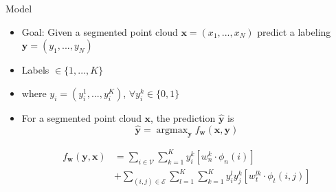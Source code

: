 \documentclass{beamer}
\DeclareMathOperator*{\argmax}{argmax}
\newcommand{\x}{{\mathbf x}}     %
\newcommand{\xs}[1]{{x_{#1}}}    %
\newcommand{\y}{{\mathbf y}}     %
\newcommand{\ys}[1]{{y_{#1}}}    %
\newcommand{\ysc}[2]{{y_{#1}^{#2}}}    %
\newcommand{\fn}[1]{{\phi_n(#1)}}      %
\newcommand{\fe}[3]{{\phi_{#1}(#2,#3)}}%
\newcommand{\w}{{\mathbf w}}           %
\newcommand{\wn}[1]{{w_n^{#1}}}        %
\newcommand{\we}[3]{{w_{#1}^{#2#3}}}   %
\newcommand{\df}[3]{{f_{#3}(#1,#2)}}   %
\begin{document}
\begin{frame}{Model}
\begin{itemize}


\item Goal: Given a segmented point cloud $\x=(\xs{1},...,\xs{N})$  predict a labeling $\y=(\ys{1},...,\ys{N})$
\item Labels $\in  \{ 1, ..., K \} $
\item where $\ys{i}=(\ysc{i}{1},...,\ysc{i}{K})$,  $ \forall \ysc{i}{k} \in \{0,1\}$ 


\item For a segmented point cloud $\x$, the prediction $\hat{\y}$ is 
\begin{equation} \label{eq:argmax}
\hat{\y} = \argmax_\y \df{\x}{\y}{\w}
\end{equation}

\pause
\begin{equation} \label{eq:model}
\begin{split}
\df{\y}{\x}{\w} & = \sum_{i \in \mathcal{V}} \sum_{k=1}^{K} \ysc{i}{k} \left[\wn{k} \cdot \fn{i} \right] \\
 & + \sum_{(i,j)\in \mathcal{E}}   \sum_{l=1}^{K}  \sum_{k=1}^{K} \ysc{i}{l} \ysc{j}{k}  \left[\we{t}{l}{k} \cdot \fe{t}{i}{j}\right] 
 \end{split}
\end{equation}

\end{itemize}
\end{frame}

\end{document}
